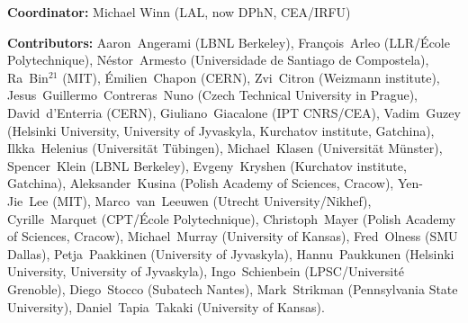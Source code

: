 \centerline{\small {\bf Coordinator:} Michael Winn (LAL, now DPhN, CEA/IRFU) %
}
\begin{flushleft}
\small
{\bf Contributors:}
 Aaron~Angerami (LBNL Berkeley), %
 Fran\c{c}ois~Arleo (LLR/{\'E}cole Polytechnique), %
 N{\'e}stor~Armesto (Universidade de Santiago de Compostela), %
 Ra~Bin$^{21}$ (MIT), %
 {\'E}milien~Chapon (CERN), %
 Zvi~Citron (Weizmann institute), %
 Jesus~Guillermo~Contreras~Nuno (Czech Technical University in Prague),  %
 David~d'Enterria (CERN), %
 Giuliano~Giacalone (IPT CNRS/CEA), %
 Vadim~Guzey (Helsinki University, University of Jyvaskyla, Kurchatov institute, Gatchina),  %
 Ilkka~Helenius (Universit\"{a}t T\"{u}bingen), %
 Michael~Klasen (Universit\"{a}t M\"{u}nster), %
 Spencer~Klein (LBNL Berkeley), %
 Evgeny~Kryshen (Kurchatov institute, Gatchina), %
 Aleksander~Kusina (Polish Academy of Sciences, Cracow), %
 Yen-Jie~Lee (MIT), %
 Marco~van~Leeuwen (Utrecht University/Nikhef), %
 Cyrille~Marquet (CPT/{\'E}cole Polytechnique), %
 Christoph~Mayer  (Polish Academy of Sciences, Cracow), %
 Michael~Murray (University of Kansas),%
 Fred~Olness (SMU Dallas), %
 Petja~Paakkinen (University of Jyvaskyla),%
 Hannu~Paukkunen (Helsinki University, University of Jyvaskyla), %
 Ingo~Schienbein (LPSC/Universit{\'e} Grenoble), %
 Diego~Stocco (Subatech Nantes), %
 Mark~Strikman (Pennsylvania State University), %
 Daniel~Tapia~Takaki (University of Kansas). %
 \bigskip
 \\

\end{flushleft}
